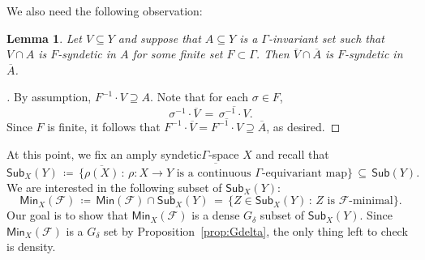 \documentclass[11pt,reqno,psamsfonts]{amsart}
\theoremstyle{bfnote}
\newtheorem{lemma}[theo]{Lemma}
\theoremstyle{definition}
\theoremstyle{remark}
\newcommand{\0}{\varnothing}
\newcommand{\set}[1]{\{#1\}}
\newcommand{\defeq}{\coloneqq}
\newcommand{\G}{\Gamma}
\newcommand{\Sub}{\mathsf{Sub}}
\newcommand{\sr}{amply syndetic\xspace}
\newcommand{\Sr}{Amply syndetic\xspace}
\newcommand{\Min}{\mathsf{Min}}
\numberwithin{equation}{section}
\newenvironment{scproof}[1][]{\begin{proof}[\textsc{\upshape{Proof}}#1]}{\end{proof}}
\begin{document}
    We also need the following observation:

    \begin{lemma}\label{lemma:closure}
        Let $V \subseteq Y$ and suppose that $A \subseteq Y$ is a $\G$-invariant set such that $V \cap A$ is $F$-syndetic in $A$ for some finite set $F \subset \G$. Then $\overline{V} \cap \overline{A}$ is $F$-syndetic in $\overline{A}$.
    \end{lemma}
    \begin{scproof}
        By assumption, %
        $F^{-1} \cdot V \supseteq A$. Note that for each $\sigma \in F$,
        \[\sigma^{-1} \cdot \overline{V} \,=\, \overline {\sigma^{-1} \cdot V}.\]
        Since $F$ is finite, it follows that $F^{-1} \cdot \overline{V} = \overline{F^{-1} \cdot V} \supseteq \overline{A}$, as desired.
    \end{scproof}


    At this point, we fix an \sr $\G$-space $X$ and recall that
    \[
        \Sub_X(Y) \,\defeq\, \overline{\big\{\overline{\rho(X)} \,:\, \text{$\rho \colon X \to Y$ is a continuous $\G$-equivariant map}\big\}} \,\subseteq\, \Sub(Y).
    \]
    We are interested in the following subset of $\Sub_X(Y)$:
    \[
        \Min_X(\mathcal{F}) \,\defeq\, \Min(\mathcal{F}) \cap \Sub_X(Y) \,=\, \set{Z \in \Sub_X(Y) \,:\, \text{$Z$ is $\mathcal{F}$-minimal}}.
    \]
    Our goal is to show that $\Min_X(\mathcal{F})$ is a dense $G_\delta$ subset of $\Sub_X(Y)$. Since $\Min_X(\mathcal{F})$ is a $G_\delta$ set by Proposition~\ref{prop:Gdelta}, the only thing left to check is density.
\end{document}
